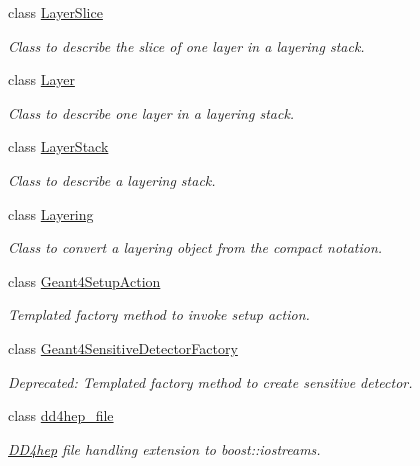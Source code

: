 \begin{DoxyCompactItemize}
class \hyperlink{class_d_d4hep_1_1_layer_slice}{LayerSlice}
\begin{DoxyCompactList}\small\item\em Class to describe the slice of one layer in a layering stack. \item\end{DoxyCompactList}\item 
class \hyperlink{class_d_d4hep_1_1_layer}{Layer}
\begin{DoxyCompactList}\small\item\em Class to describe one layer in a layering stack. \item\end{DoxyCompactList}\item 
class \hyperlink{class_d_d4hep_1_1_layer_stack}{LayerStack}
\begin{DoxyCompactList}\small\item\em Class to describe a layering stack. \item\end{DoxyCompactList}\item 
class \hyperlink{class_d_d4hep_1_1_layering}{Layering}
\begin{DoxyCompactList}\small\item\em Class to convert a layering object from the compact notation. \item\end{DoxyCompactList}\item 
class \hyperlink{class_d_d4hep_1_1_geant4_setup_action}{Geant4SetupAction}
\begin{DoxyCompactList}\small\item\em Templated factory method to invoke setup action. \item\end{DoxyCompactList}\item 
class \hyperlink{class_d_d4hep_1_1_geant4_sensitive_detector_factory}{Geant4SensitiveDetectorFactory}
\begin{DoxyCompactList}\small\item\em Deprecated: Templated factory method to create sensitive detector. \item\end{DoxyCompactList}\item 
class \hyperlink{class_d_d4hep_1_1dd4hep__file}{dd4hep\_\-file}
\begin{DoxyCompactList}\small\item\em \hyperlink{namespace_d_d4hep}{DD4hep} file handling extension to boost::iostreams. \item\end{DoxyCompactList}\item 

\end{DoxyCompactItemize}
